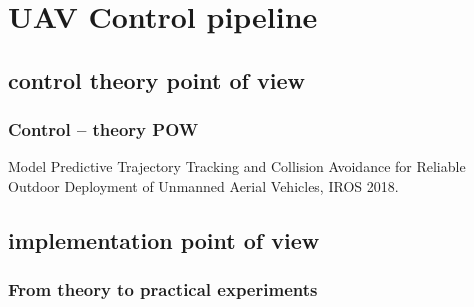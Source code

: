\documentclass[aspectratio=1610]{beamer}
\begin{document}
\section{UAV Control pipeline}
\subsection{control theory point of view}

\begin{frame}
  \frametitle{Control -- theory POW}

  \begin{figure}
    \begin{adjustbox}{max totalsize={1.0\textwidth}{.85\textheight}, center}
      
    \end{adjustbox}
  \end{figure}

  \begin{block}{\cite{iros}}
    Model Predictive Trajectory Tracking and Collision Avoidance for Reliable Outdoor Deployment of Unmanned Aerial Vehicles, IROS 2018.
  \end{block}

\end{frame}

\subsection{implementation point of view}



\begin{frame}
  \frametitle{From theory to practical experiments}

  \begin{columns}[c]



  \end{columns}

\end{frame}
\end{document}
